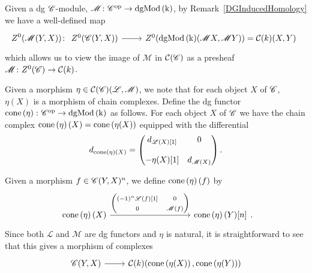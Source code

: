 \documentclass[dissertation.tex]{subfiles}
\begin{document}
Given a dg $\mathscr{C}$-module, $\mathscr{M} \colon \mathscr{C}^\text{op} \rightarrow \operatorname{dgMod\left(k\right)}$, by Remark~\ref{DGInducedHomology} we have a well-defined map
$$Z^0(\mathscr{M}(Y,X)) \colon
\begin{tikzcd}
  Z^0(\CC(Y,X)) \arrow{r} & Z^0(\cdg{k}(\mathscr{M}X,\mathscr{M}Y)) = \mathcal{C}(k)(X,Y)
\end{tikzcd}$$
which allows us to view the image of $\mathscr{M}$ in $\mathcal{C}(\mathscr{C})$ as a presheaf $\mathscr{M} \colon Z^0(\mathscr{C}) \to \mathcal{C}(k)$.

\begin{defn}
  Given a morphism $\eta \in \mathcal{C}(\mathscr{C})(\mathscr{L}, \mathscr{M})$, we note that for each object $X$ of $\mathscr{C}$, $\eta(X)$ is a morphism of chain complexes.
  Define the dg functor $\operatorname{cone}\left(\eta\right) \colon \mathscr{C}^\text{op} \rightarrow \operatorname{dgMod\left(k\right)}$ as follows.
  For each object $X$ of $\mathscr{C}$ we have the chain complex $\operatorname{cone}\left(\eta\right)(X) = \operatorname{cone}\left(\eta(X)\right)$ equipped with the differential
  $$d_{\operatorname{cone}\left(\eta\right)(X)} = \left(\begin{matrix}
    d_{\mathscr{L}(X)[1]} & 0\\
    \\
    -\eta(X)[1] & d_{\mathscr{M}(X)}
  \end{matrix}\right).$$

  Given a morphism $f \in \mathscr{C}(Y,X)^n$, we define $\operatorname{cone}\left(\eta\right)(f)$ by
  $$\begin{tikzcd}[ampersand replacement=\&]
    \cone{\eta}(X) \arrow{rrrr}{\left(\begin{matrix}(-1)^n\mathscr{L}(f)[1] & 0\\0 & \mathscr{M}(f)\end{matrix}\right)} \&\&\&\& \cone{\eta}(Y)[n]
  \end{tikzcd}.$$
  Since both $\mathscr{L}$ and $\mathscr{M}$ are dg functors and $\eta$ is natural, it is straightforward to see that this gives a morphism of complexes
  $$\begin{tikzcd}
    \CC(Y,X) \arrow{r} & \mathcal{C}(k)(\cone{\eta(X)}, \cone{\eta(Y)})
  \end{tikzcd}$$
\end{defn}
\end{document}
